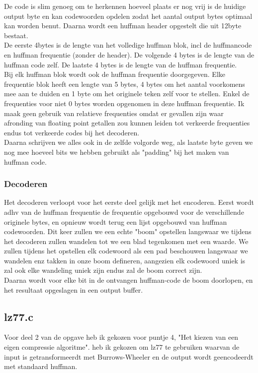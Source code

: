 \documentclass[10pt,a4paper]{report}
\begin{document}
De code is slim genoeg om te herkennen hoeveel plaats er nog vrij is de huidige output byte en kan codewoorden opdelen zodat het aantal output bytes optimaal kan worden benut.
Daarna wordt een huffman header opgestelt die uit 12byte bestaat.\\
De eerste 4bytes is de lengte van het volledige huffman blok, incl de huffmancode en huffman frequentie  (zonder de header). 
De volgende 4 bytes is de lengte van de huffman code zelf. De laatste 4 bytes is de lengte van de huffman frequentie.\\

Bij elk huffman blok wordt ook de huffman frequentie doorgegeven. Elke frequentie blok heeft een lengte van 5 bytes, 4 bytes om het aantal voorkomens mee aan te duiden en 1 byte om het originele teken zelf voor te stellen. Enkel de frequenties voor niet 0 bytes worden opgenomen in deze huffman frequentie. Ik maak geen gebruik van relatieve frequenties omdat er gevallen zijn waar afronding van floating point getallen zou kunnen leiden tot verkeerde frequenties endus tot verkeerde codes bij het decoderen.\\
Daarna schrijven we alles ook in de zelfde volgorde weg, als laatste byte geven we nog mee hoeveel bits we hebben gebruikt als "padding" bij het maken van huffman code.
\subsubsection*{Decoderen}
Het decoderen verloopt voor het eerste deel gelijk met het encoderen. Eerst wordt adhv van de huffman frequentie de frequentie opgebouwd voor de verschillende originele bytes, en opnieuw wordt terug een lijst opgebouwd van huffman codewoorden. Dit keer zullen we een echte "boom" opstellen langswaar we tijdens het decoderen zullen wandelen tot we een blad tegenkomen met een waarde. We zullen tijdens het opstellen elk codewoord als een pad beschouwen langswaar we wandelen enz takken in onze boom defineren, aangezien elk codewoord uniek is zal ook elke wandeling uniek zijn endus zal de boom correct zijn.\\

Daarna wordt voor elke bit in de ontvangen huffman-code de boom doorlopen, en het resultaat opgeslagen in een output buffer. 
\subsection*{lz77.c}
Voor deel 2 van de opgave heb ik gekozen voor puntje 4, "Het kiezen van een eigen compressie algoritme". heb ik gekozen om lz77 te gebruiken waarvan de input is getransformeerdt met Burrows-Wheeler en de output wordt geencodeerdt met standaard huffman. \\
\end{document}
